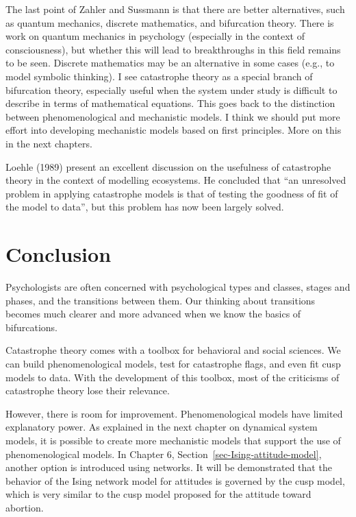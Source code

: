 \documentclass[
  a4paper,
  DIV=11,
  numbers=noendperiod,
  oneside]{scrreprt}
\begin{document}
The last point of Zahler and Sussmann is that there are better
alternatives, such as quantum mechanics, discrete mathematics, and
bifurcation theory. There is work on quantum mechanics in psychology
(especially in the context of consciousness), but whether this will lead
to breakthroughs in this field remains to be seen. Discrete mathematics
may be an alternative in some cases (e.g., to model symbolic thinking).
I see catastrophe theory as a special branch of bifurcation theory,
especially useful when the system under study is difficult to describe
in terms of mathematical equations. This goes back to the distinction
between phenomenological and mechanistic models. I think we should put
more effort into developing mechanistic models based on first
principles. More on this in the next chapters.

Loehle (1989) present an excellent discussion on the usefulness of
catastrophe theory in the context of modelling ecosystems. He concluded
that ``an unresolved problem in applying catastrophe models is that of
testing the goodness of fit of the model to data'', but this problem has
now been largely solved.

\hypertarget{sec-Conclusion}{%
\section{Conclusion}\label{sec-Conclusion}}

Psychologists are often concerned with psychological types and classes,
stages and phases, and the transitions between them. Our thinking about
transitions becomes much clearer and more advanced when we know the
basics of bifurcations.

Catastrophe theory comes with a toolbox for behavioral and social
sciences. We can build phenomenological models, test for catastrophe
flags, and even fit cusp models to data. With the development of this
toolbox, most of the criticisms of catastrophe theory lose their
relevance.

However, there is room for improvement. Phenomenological models have
limited explanatory power. As explained in the next chapter on dynamical
system models, it is possible to create more mechanistic models that
support the use of phenomenological models. In Chapter 6,
Section~\ref{sec-Ising-attitude-model}, another option is introduced
using networks. It will be demonstrated that the behavior of the Ising
network model for attitudes is governed by the cusp model, which is very
similar to the cusp model proposed for the attitude toward abortion.
\end{document}
